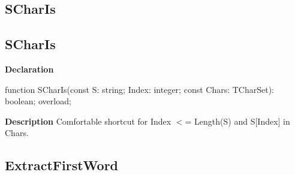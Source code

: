 \documentclass{report}
\newif\ifpdf
\begin{document}
\subsection*{\large{\textbf{SCharIs}}\normalsize\hspace{1ex}\hrulefill}
\else
\subsection*{SCharIs}
\fi
\label{PasDoc_Utils-SCharIs}
\begin{list}{}{
\setlength{\itemindent}{0cm}
\setlength{\listparindent}{0cm}
\setlength{\leftmargin}{\evensidemargin}
\addtolength{\leftmargin}{\tmplength}
\settowidth{\labelsep}{X}
\addtolength{\leftmargin}{\labelsep}
\setlength{\labelwidth}{\tmplength}
}
\item[\textbf{Declaration}\hfill]
\ifpdf
\begin{flushleft}
\fi
\begin{ttfamily}
function SCharIs(const S: string; Index: integer; const Chars: TCharSet): boolean; overload;\end{ttfamily}

\ifpdf
\end{flushleft}
\fi

\par
\item[\textbf{Description}]
Comfortable shortcut for Index {$<$}= Length(S) and S[Index] in Chars.

\end{list}
\ifpdf
\subsection*{\large{\textbf{ExtractFirstWord}}\normalsize\hspace{1ex}\hrulefill}
\else
\end{document}
